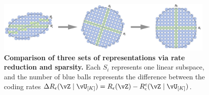 \documentclass[../../book-main.tex]{subfiles}
\begin{document}


\begin{figure}[t!]
     \centering
         \includegraphics[width=0.95\textwidth]{figs_chap4/coding-transform.png}
     \caption{ \small\textbf{Comparison of three sets of  representations via rate reduction and sparsity.} Each $S_i$ represents one linear subspace, and the number of blue balls represents the difference between the coding rates $\Delta R_{\epsilon}(\vZ \mid \vU_{[K]}) = R_\epsilon(\vZ) - R^c_\epsilon(\vZ \mid \vU_{[K]})$. 
     }
        \label{fig:sparse-rate-reduction-diagram}
\end{figure}
\end{document}

